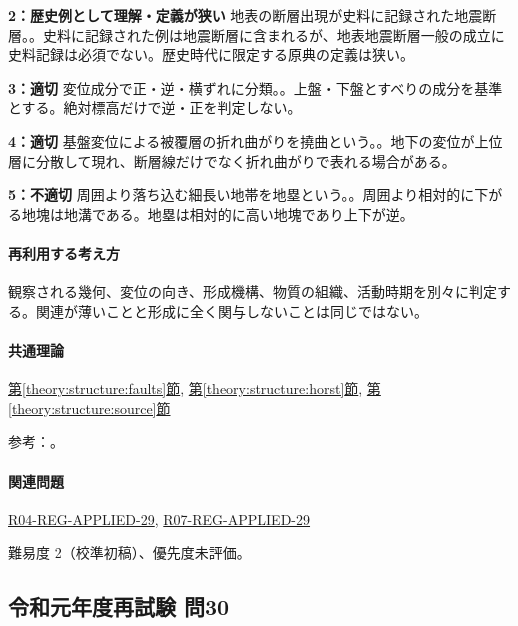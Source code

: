 \noindent\textbf{2：歴史例として理解・定義が狭い} 地表の断層出現が史料に記録された地震断層。。史料に記録された例は地震断層に含まれるが、地表地震断層一般の成立に史料記録は必須でない。歴史時代に限定する原典の定義は狭い。\par

\noindent\textbf{3：適切} 変位成分で正・逆・横ずれに分類。。上盤・下盤とすべりの成分を基準とする。絶対標高だけで逆・正を判定しない。\par

\noindent\textbf{4：適切} 基盤変位による被覆層の折れ曲がりを撓曲という。。地下の変位が上位層に分散して現れ、断層線だけでなく折れ曲がりで表れる場合がある。\par

\noindent\textbf{5：不適切} 周囲より落ち込む細長い地帯を地塁という。。周囲より相対的に下がる地塊は地溝である。地塁は相対的に高い地塊であり上下が逆。\par

\paragraph{再利用する考え方} 観察される幾何、変位の向き、形成機構、物質の組織、活動時期を別々に判定する。関連が薄いことと形成に全く関与しないことは同じではない。

\paragraph{共通理論} \hyperref[theory:structure:faults]{第\ref*{theory:structure:faults}節}, \hyperref[theory:structure:horst]{第\ref*{theory:structure:horst}節}, \hyperref[theory:structure:source]{第\ref*{theory:structure:source}節}

\par 参考：\cite{str_source}。

\paragraph{関連問題} \hyperref[q:r04-reg-applied-29]{R04-REG-APPLIED-29}, \hyperref[q:r07-reg-applied-29]{R07-REG-APPLIED-29}

\par 難易度 2（校準初稿）、優先度未評価。

\subsection{令和元年度再試験 問30}
\label{q:r01-ret-applied-30}

